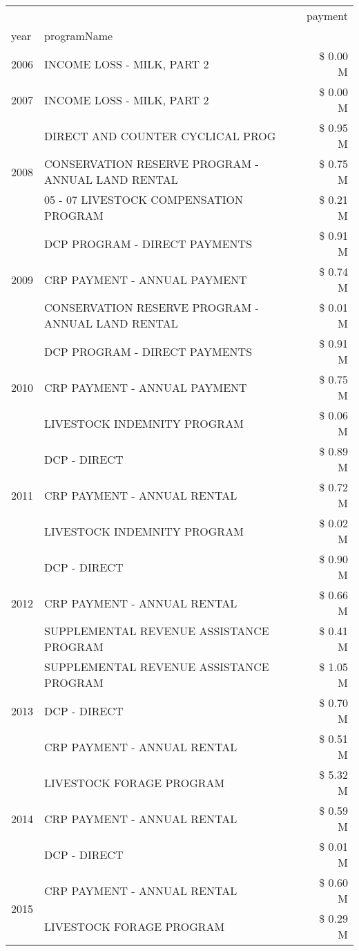 \begin{tabular}{llr}
\toprule
 &  & payment \\
year & programName &  \\
\midrule
2006 & INCOME LOSS - MILK, PART 2 & \$ 0.00 M \\
\cline{1-3}
2007 & INCOME LOSS - MILK, PART 2 & \$ 0.00 M \\
\cline{1-3}
\multirow[t]{3}{*}{2008} & DIRECT AND COUNTER CYCLICAL PROG & \$ 0.95 M \\
 & CONSERVATION RESERVE PROGRAM - ANNUAL LAND RENTAL & \$ 0.75 M \\
 & 05 - 07 LIVESTOCK COMPENSATION PROGRAM & \$ 0.21 M \\
\cline{1-3}
\multirow[t]{3}{*}{2009} & DCP PROGRAM - DIRECT PAYMENTS & \$ 0.91 M \\
 & CRP PAYMENT - ANNUAL PAYMENT & \$ 0.74 M \\
 & CONSERVATION RESERVE PROGRAM - ANNUAL LAND RENTAL & \$ 0.01 M \\
\cline{1-3}
\multirow[t]{3}{*}{2010} & DCP PROGRAM - DIRECT PAYMENTS & \$ 0.91 M \\
 & CRP PAYMENT - ANNUAL PAYMENT & \$ 0.75 M \\
 & LIVESTOCK INDEMNITY PROGRAM & \$ 0.06 M \\
\cline{1-3}
\multirow[t]{3}{*}{2011} & DCP - DIRECT & \$ 0.89 M \\
 & CRP PAYMENT - ANNUAL RENTAL & \$ 0.72 M \\
 & LIVESTOCK INDEMNITY PROGRAM & \$ 0.02 M \\
\cline{1-3}
\multirow[t]{3}{*}{2012} & DCP - DIRECT & \$ 0.90 M \\
 & CRP PAYMENT - ANNUAL RENTAL & \$ 0.66 M \\
 & SUPPLEMENTAL REVENUE ASSISTANCE PROGRAM & \$ 0.41 M \\
\cline{1-3}
\multirow[t]{3}{*}{2013} & SUPPLEMENTAL REVENUE ASSISTANCE PROGRAM & \$ 1.05 M \\
 & DCP - DIRECT & \$ 0.70 M \\
 & CRP PAYMENT - ANNUAL RENTAL & \$ 0.51 M \\
\cline{1-3}
\multirow[t]{3}{*}{2014} & LIVESTOCK FORAGE PROGRAM & \$ 5.32 M \\
 & CRP PAYMENT - ANNUAL RENTAL & \$ 0.59 M \\
 & DCP - DIRECT & \$ 0.01 M \\
\cline{1-3}
\multirow[t]{3}{*}{2015} & CRP PAYMENT - ANNUAL RENTAL & \$ 0.60 M \\
 & LIVESTOCK FORAGE PROGRAM & \$ 0.29 M \\

\end{tabular}

